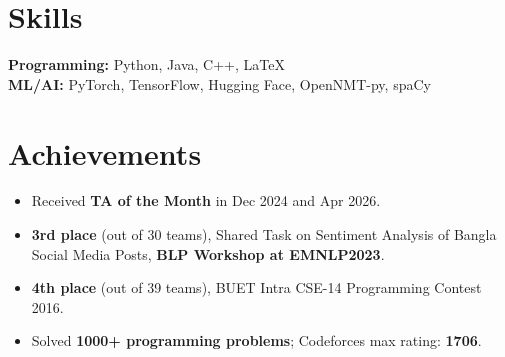 \documentclass[10pt]{extarticle}
\begin{document}
\vspace{-1em}
\section*{Skills}
\textbf{Programming:} Python, Java, C++, LaTeX\\
\textbf{ML/AI:} PyTorch, TensorFlow, Hugging Face, OpenNMT-py, spaCy\\

\vspace{-1em}
\section*{Achievements}
\begin{itemize}
    \item Received \textbf{TA of the Month} in Dec 2024 and Apr 2026.
    \item \textbf{3rd place} (out of 30 teams), Shared Task on Sentiment Analysis of Bangla Social Media Posts, \textbf{BLP Workshop at EMNLP2023}.
    \item \textbf{4th place} (out of 39 teams), BUET Intra CSE-14 Programming Contest 2016.
    \item Solved \textbf{1000+ programming problems}; Codeforces max rating: \textbf{1706}.
\end{itemize}
\end{document}
